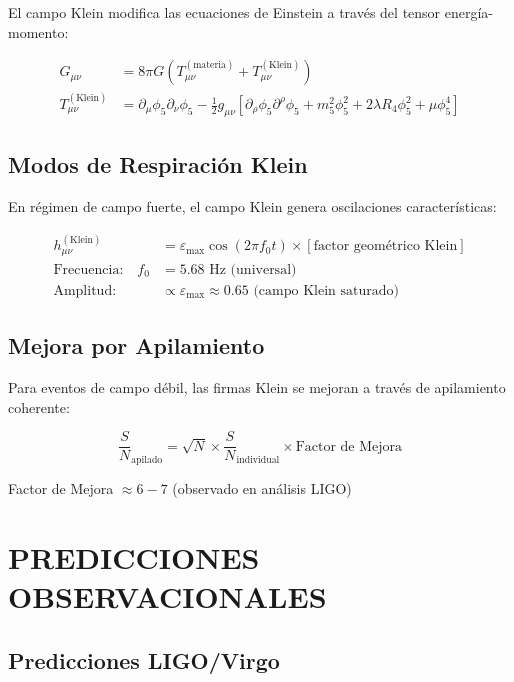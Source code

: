 \documentclass[12pt,a4paper]{article}
\begin{document}
El campo Klein modifica las ecuaciones de Einstein a través del tensor energía-momento:

\begin{align}
G_{\mu\nu} &= 8\pi G(T_{\mu\nu}^{(\text{materia})} + T_{\mu\nu}^{(\text{Klein})})\\
T_{\mu\nu}^{(\text{Klein})} &= \partial_\mu\phi_5 \partial_\nu\phi_5 - \frac{1}{2}g_{\mu\nu}[\partial_\rho\phi_5 \partial^\rho\phi_5 + m_5^2\phi_5^2 + 2\lambda R_4\phi_5^2 + \mu\phi_5^4]
\end{align}

\subsection{Modos de Respiración Klein}

En régimen de campo fuerte, el campo Klein genera oscilaciones características:

\begin{align}
h_{\mu\nu}^{(\text{Klein})} &= \varepsilon_{\max} \cos(2\pi f_0 t) \times [\text{factor geométrico Klein}]\\
\text{Frecuencia:} \quad f_0 &= 5.68 \text{ Hz (universal)}\\
\text{Amplitud:} \quad &\propto \varepsilon_{\max} \approx 0.65 \text{ (campo Klein saturado)}
\end{align}

\subsection{Mejora por Apilamiento}

Para eventos de campo débil, las firmas Klein se mejoran a través de apilamiento coherente:

\begin{equation}
\frac{S}{N}_{\text{apilado}} = \sqrt{N} \times \frac{S}{N}_{\text{individual}} \times \text{Factor de Mejora}
\end{equation}

Factor de Mejora $\approx 6-7$ (observado en análisis LIGO)

\section{PREDICCIONES OBSERVACIONALES}

\subsection{Predicciones LIGO/Virgo}
\end{document}
